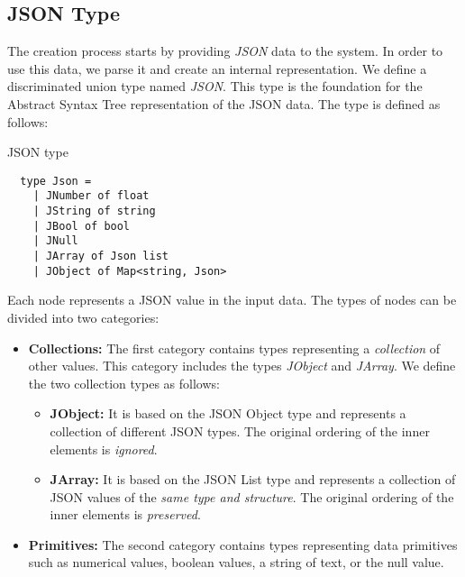 \subsection{JSON Type}
\label{sub:json}
The creation process starts by providing \emph{JSON} data to the system.
In order to use this data, we parse it and create an internal representation.
We define a discriminated union type named \emph{JSON}.
This type is the foundation for the Abstract Syntax Tree representation of the JSON data.
The type is defined as follows:
\begin{listing}[h]
	\caption {JSON type}
	\begin{lstlisting}
  type Json =
    | JNumber of float
    | JString of string
    | JBool of bool
    | JNull
    | JArray of Json list
    | JObject of Map<string, Json>
  \end{lstlisting}
\end{listing}

Each node represents a JSON value in the input data.
The types of nodes can be divided into two categories:
\begin{itemize}
	\item {\textbf{Collections:} The first category contains types representing a \emph{collection} of other values. This category includes the types \emph{JObject} and \emph{JArray}.
	      We define the two collection types as follows:
	      \begin{itemize}
		      \item \textbf{JObject:} It is based on the JSON Object type and represents a collection of different JSON types. The original ordering of the inner elements is \emph{ignored}.
		      \item \textbf{JArray:} It is based on the JSON List type and represents a collection of JSON values of the \emph{same type and structure}. The original ordering of the inner elements is \emph{preserved}.
	      \end{itemize}
	      }
	\item \textbf{Primitives:} The second category contains types representing data primitives such as numerical values, boolean values,
	      a string of text, or the null value.
\end{itemize}


